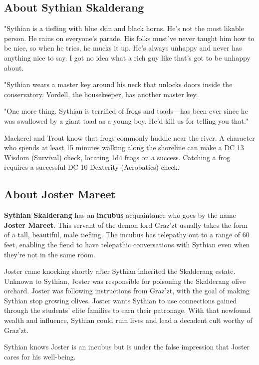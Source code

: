 \documentclass[10pt,a4paper,twoside,bg=print,twocolumn,openany,nodeprecatedcode]{dndbook}
\begin{document}
\subsection{About Sythian Skalderang}
\begin{DndReadAloud}{}
"Sythian is a tiefling with blue skin and black horns. He's not the most likable person. He rains on everyone's parade. His folks must've never taught him how to be nice, so when he tries, he mucks it up. He's always unhappy and never has anything nice to say. I got no idea what a rich guy like that's got to be unhappy about.

"Sythian wears a master key around his neck that unlocks doors inside the conservatory. Vordell, the housekeeper, has another master key.

"One more thing. Sythian is terrified of frogs and toads—has been ever since he was swallowed by a giant toad as a young boy. He'd kill us for telling you that."

\end{DndReadAloud}

Mackerel and Trout know that frogs commonly huddle near the river. A character who spends at least 15 minutes walking along the shoreline can make a DC 13 Wisdom (Survival) check, locating 1d4 frogs on a success. Catching a frog requires a successful DC 10 Dexterity (Acrobatics) check.

\subsection{About Joster Mareet}
\textbf{Sythian Skalderang} has an \textbf{incubus} acquaintance who goes by the name \textbf{Joster Mareet}. This servant of the demon lord Graz'zt usually takes the form of a tall, beautiful, male tiefling. The incubus has telepathy out to a range of 60 feet, enabling the fiend to have telepathic conversations with Sythian even when they're not in the same room.

Joster came knocking shortly after Sythian inherited the Skalderang estate. Unknown to Sythian, Joster was responsible for poisoning the Skalderang olive orchard. Joster was following instructions from Graz'zt, with the goal of making Sythian stop growing olives. Joster wants Sythian to use connections gained through the students' elite families to earn their patronage. With that newfound wealth and influence, Sythian could ruin lives and lead a decadent cult worthy of Graz'zt.

Sythian knows Joster is an incubus but is under the false impression that Joster cares for his well-being.
\end{document}
